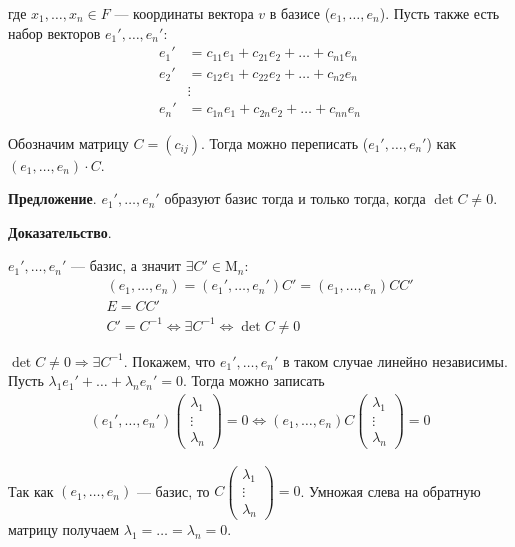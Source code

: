 \documentclass[a4paper, 12pt]{article}
\newcommand*\circled[1]{\tikz[baseline=(char.base)]{
        \node[shape=circle,draw,inner sep=1.5pt] (char) {#1};}}
\begin{document}
\vspace{-3mm}
где $x_1, \ldots, x_n \in F$ --- координаты вектора $v$ в базисе ($e_1, \ldots, e_n$). Пусть также есть набор векторов $e_1', \ldots, e_n'$:
\[\begin{aligned}
e_1' &= c_{11}e_1 + c_{21}e_2 + \ldots + c_{n1}e_n \\
e_2' &= c_{12}e_1 + c_{22}e_2 + \ldots + c_{n2}e_n \\
&\vdots \\
e_n' &= c_{1n}e_1 + c_{2n}e_2 + \ldots + c_{nn}e_n
\end{aligned}\]

Обозначим матрицу $C = (c_{ij})$. Тогда можно переписать ($e_1', \ldots, e_n'$) как $(e_1, \ldots, e_n) \cdot C$.

\vspace{5mm}
\textbf{Предложение}. $e_1', \ldots, e_n'$ образуют базис тогда и только тогда, когда $\det C \neq 0$.

\textbf{Доказательство}.

\circled{$\Rightarrow$} $e_1', \ldots, e_n'$ --- базис, а значит $\exists C' \in \text{M}_n:$
\vspace{-3mm}
\begin{gather*}
(e_1, \ldots, e_n) = (e_1', \ldots, e_n')C' = (e_1, \ldots, e_n)CC' \\
E = CC' \\
C' = C^{-1} \Longleftrightarrow \exists C^{-1} \Longleftrightarrow \det C \neq 0
\end{gather*}

\circled{$\Leftarrow$} $\det C \neq 0 \Rightarrow \exists C^{-1}$. Покажем, что $e_1', \ldots, e_n'$ в таком случае линейно независимы. Пусть $\lambda_1e_1' + \ldots + \lambda_ne_n' = 0$. Тогда можно записать
\vspace{-3mm}
\begin{gather*}
(e_1', \ldots, e_n')
\begin{pmatrix}
\lambda_1 \\
\vdots \\
\lambda_n
\end{pmatrix} = 0 \Longleftrightarrow
(e_1, \ldots, e_n)C
\begin{pmatrix}
\lambda_1 \\
\vdots \\
\lambda_n
\end{pmatrix} = 0
\end{gather*}

\vspace{-3mm}
Так как $(e_1, \ldots, e_n)$ --- базис, то $
C
\begin{pmatrix}
\lambda_1 \\
\vdots \\
\lambda_n
\end{pmatrix} = 0$. Умножая слева на обратную матрицу получаем $\lambda_1 = \ldots = \lambda_n = 0$.
\end{document}
